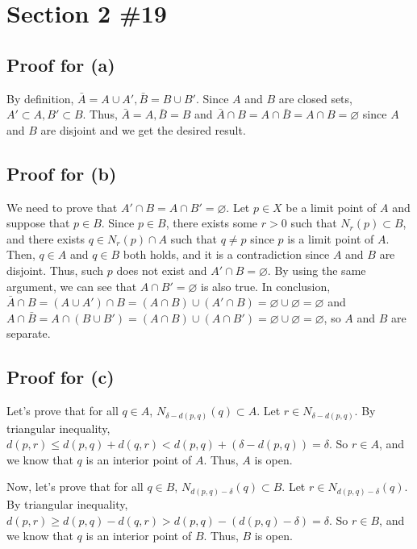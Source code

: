 \documentclass{scrartcl}
\begin{document}
\section{Section 2 \#19}
\subsection{Proof for (a)}
By definition, \(\bar{A} = A \cup A', \bar{B} = B \cup B'\).
Since \(A\) and \(B\) are closed sets, \(A' \subset A, B' \subset B\).
Thus, \(\bar{A} = A, \bar{B} = B\) and \(\bar{A} \cap B = A \cap \bar{B} = A \cap B = \varnothing\) since \(A\) and \(B\) are disjoint and we get the desired result.

\subsection{Proof for (b)}
We need to prove that \(A' \cap B = A \cap B' = \varnothing\).
Let \(p \in X\) be a limit point of \(A\) and suppose that \(p \in B\).
Since \(p \in B\), there exists some \(r > 0\) such that \(N_r(p) \subset B\), and there exists \(q \in N_r(p) \cap A\) such that \(q \not = p\) since \(p\) is a limit point of \(A\).
Then, \(q \in A\) and \(q \in B\) both holds, and it is a contradiction since \(A\) and \(B\) are disjoint.
Thus, such \(p\) does not exist and \(A' \cap B = \varnothing\).
By using the same argument, we can see that \(A \cap B' = \varnothing\) is also true.
In conclusion, \(\bar{A} \cap B = (A \cup A') \cap B = (A \cap B) \cup (A' \cap B) = \varnothing \cup \varnothing = \varnothing\) and \(A \cap \bar{B} = A \cap (B \cup B') = (A \cap B) \cup (A \cap B') = \varnothing \cup \varnothing = \varnothing\), so \(A\) and \(B\) are separate.

\subsection{Proof for (c)}
Let's prove that for all \(q \in A\), \(N_{\delta - d(p, q)}(q) \subset A\).
Let \(r \in N_{\delta - d(p, q)}\).
By triangular inequality, \(d(p, r) \leq d(p, q) + d(q, r) < d(p, q) + (\delta - d(p, q)) = \delta\).
So \(r \in A\), and we know that \(q\) is an interior point of \(A\).
Thus, \(A\) is open.

Now, let's prove that for all \(q \in B\), \(N_{d(p, q) - \delta}(q) \subset B\).
Let \(r \in N_{d(p, q) - \delta}(q)\).
By triangular inequality, \(d(p, r) \geq d(p, q) - d(q, r) > d(p, q) - (d(p, q) - \delta) = \delta\).
So \(r \in B\), and we know that \(q\) is an interior point of \(B\).
Thus, \(B\) is open.
\end{document}
